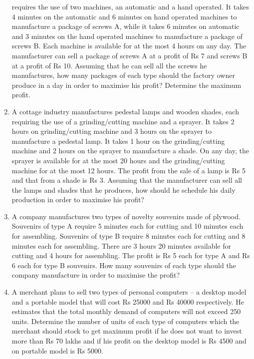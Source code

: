 \begin{enumerate}[label=\arabic*.,ref=\thesubsection.\theenumi]
requires the use of two machines, an automatic and a hand operated. It takes
4 minutes on the automatic and 6 minutes on hand operated machines to
manufacture a package of screws A, while it takes 6 minutes on automatic and
3 minutes on the hand operated machines to manufacture a package of screws
B. Each machine is available for at the most 4 hours on any day. The manufacturer
can sell a package of screws A at a profit of Rs 7 and screws B at a profit of
Rs 10. Assuming that he can sell all the screws he manufactures, how many
packages of each type should the factory owner produce in a day in order to
maximise his profit? Determine the maximum profit.\\
\item A cottage industry manufactures pedestal lamps and wooden shades, each
requiring the use of a grinding/cutting machine and a sprayer. It takes 2 hours on
grinding/cutting machine and 3 hours on the sprayer to manufacture a pedestal
lamp. It takes 1 hour on the grinding/cutting machine and 2 hours on the sprayer
to manufacture a shade. On any day, the sprayer is available for at the most 20
hours and the grinding/cutting machine for at the most 12 hours. The profit from
the sale of a lamp is Rs 5 and that from a shade is Rs 3. Assuming that the
manufacturer can sell all the lamps and shades that he produces, how should he
schedule his daily production in order to maximise his profit?\\
\item A company manufactures two types of novelty souvenirs made of plywood.
Souvenirs of type A require 5 minutes each for cutting and 10 minutes each for
assembling. Souvenirs of type B require 8 minutes each for cutting and 8 minutes
each for assembling. There are 3 hours 20 minutes available for cutting and 4
hours for assembling. The profit is Rs 5 each for type A and Rs 6 each for type
B souvenirs. How many souvenirs of each type should the company manufacture
in order to maximise the profit?\\
\item A merchant plans to sell two types of personal computers – a desktop model and
a portable model that will cost Rs 25000 and Rs 40000 respectively. He estimates
that the total monthly demand of computers will not exceed 250 units. Determine
the number of units of each type of computers which the merchant should stock
to get maximum profit if he does not want to invest more than Rs 70 lakhs and if
his profit on the desktop model is Rs 4500 and on portable model is Rs 5000.\\

\end{enumerate}
